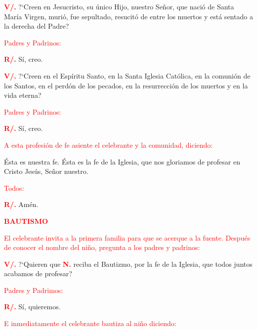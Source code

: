 \documentclass[12pt, letterpaper]{report}
\begin{document}
\newpage

\Large {\bfseries \textcolor{red}{V/.}} \hspace{0.5cm} ?`Creen en Jesucristo, su \'unico Hijo, nuestro Se\~nor, que naci\'o de Santa Mar\'ia Virgen, muri\'o, fue sepultado, resucit\'o de entre los muertos y est\'a sentado a la derecha del Padre?

\large {\textcolor{red}{Padres y Padrinos:}}

\Large {\bfseries \textcolor{red}{R/.}} \hspace{0.5cm} S\'i, creo. 

\Large {\bfseries \textcolor{red}{V/.}} \hspace{0.5cm} ?`Creen en el Esp\'iritu Santo, en la Santa Iglesia Cat\'olica, en la comuni\'on de los Santos, en el perd\'on de los pecados, en la resurrecci\'on de los muertos y en la vida eterna?

\large {\textcolor{red}{Padres y Padrinos:}}

\Large {\bfseries \textcolor{red}{R/.}} \hspace{0.5cm} S\'i, creo. 

\large {\textcolor{red}{A esta profesi\'on de fe asiente el celebrante y la comunidad, diciendo:}}

\noindent
\Large \'Esta es nuestra fe. \'Esta es la fe de la Iglesia, que nos gloriamos de profesar en Cristo Jes\'us, Se\~nor nuestro.

\large {\textcolor{red}{Todos:}}

\Large {\bfseries \textcolor{red}{R/.}} \hspace{0.5cm} Am\'en. 

\Large {\bfseries \textcolor{red}{BAUTISMO}} 

\large {\textcolor{red}{El celebrante invita a la primera familia para que se acerque a la fuente. Despu\'es de conocer el nombre del ni\~no, pregunta a los padres y padrinos:}} 

\Large {\bfseries \textcolor{red}{V/.}} \hspace{0.5cm} \Large {?`Quieren que {\bfseries \textcolor{red}{N.}} reciba el Bautizmo, por la fe de la Iglesia, que todos juntos acabamos de profesar?}

\large {\textcolor{red}{Padres y Padrimos:}}

\Large {\bfseries \textcolor{red}{R/.}} \hspace{0.5cm} S\'i, quieremos. 

\large {\textcolor{red}{E inmediatamente el celebrante bautiza al ni\~no diciendo:}}
\end{document}

